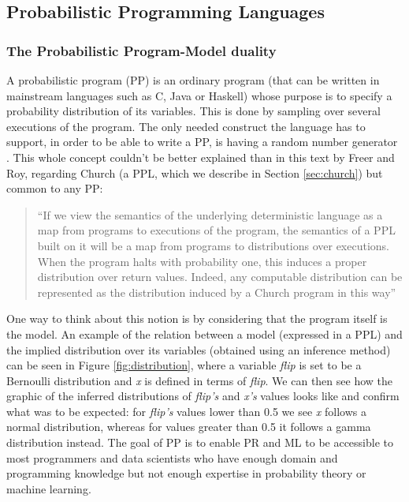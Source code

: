 \begin{itemsize}
\subsection{Probabilistic Programming Languages}
\label{sec:pp}

\subsubsection{The Probabilistic Program-Model duality}

A probabilistic program (PP) is an ordinary program (that can be written in
mainstream languages such as C, Java or Haskell) whose purpose is to specify
a probability distribution of its variables. This is done by sampling over
several executions of the program. The only needed construct the language
has to support, in order to be able to write a PP, is having a random number
generator \cite{intpp}. This whole concept couldn't be better explained than in this text by Freer and
Roy, regarding Church (a PPL, which we describe in Section \ref{sec:church})
but common to any PP:

\begin{quote}
  ``If we view the semantics of the underlying deterministic language as a map
  from programs to executions of the program, the semantics of a PPL built on it
   will be a map from programs to distributions over executions. When the
   program halts with probability one, this induces a proper distribution over
   return values. Indeed, any computable distribution can be represented as the
   distribution induced by a Church program in this way''~\cite{Freer2012}
\end{quote}

One way to think about this notion is by considering that the program itself
is the model. An example of the relation between a model (expressed in a PPL)
and the implied distribution over its variables (obtained using an inference
method) can be seen in Figure \ref{fig:distribution}, where a variable \textit{flip}
is set to be a Bernoulli distribution and \textit{x} is defined in terms of
\textit{flip}. We can then see how the graphic of the inferred distributions
of \textit{flip's} and \textit{x's} values looks like and confirm what was to
be expected: for \textit{flip's} values lower than 0.5 we see \textit{x} follows
a normal distribution, whereas for values greater than 0.5 it follows a gamma
distribution instead.
 The goal of PP is to enable PR and ML to be accessible to
most programmers and data scientists who have enough domain and programming
knowledge but not enough expertise in probability theory or machine learning.


\end{itemsize}
